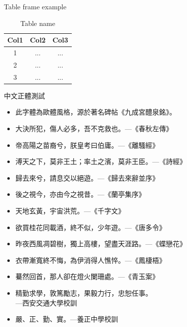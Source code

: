 \documentclass{beamer}
\begin{document}
\begin{frame}{Table frame example}

\begin{table}
    \begin{tabular}{c|cc}
        \textbf{Col1} & Col2 & Col3 \\
        \hline
        1            & ...                    & ...             \\
        2            & ...                    & ...             \\
        3            & ...                    & ...             \\
    \end{tabular}
    \caption{Table name}
    \label{tab:table1}
\end{table}

\end{frame}

\begin{frame}{中文正體測試}
    \begin{itemize}
        \item 此字體為歐體風格，源於著名碑帖《九成宮醴泉銘》。
        \item 大決所犯，傷人必多，吾不克救也。---《春秋左傳》
        \item 帝高陽之苗裔兮，朕皇考曰伯庸。---《離騷經》
        \item 溥天之下，莫非王土；率土之濱，莫非王臣。---《詩經》
        \item 歸去來兮，請息交以絕遊。---《歸去來辭並序》
        \item 後之視今，亦由今之視昔。---《蘭亭集序》
        \item 天地玄黃，宇宙洪荒。---《千字文》
        \item 欲買桂花同載酒，終不似，少年遊。---《唐多令》
        \item 昨夜西風凋碧樹，獨上高樓，望盡天涯路。---《蝶戀花》
        \item 衣帶漸寬終不悔，為伊消得人憔悴。---《鳳棲梧》
        \item 驀然回首，那人卻在燈火闌珊處。---《青玉案》
        \item 精勤求學，敦篤勵志，果毅力行，忠恕任事。\\---西安交通大學校訓
        \item 嚴、正、勤、實。---養正中學校訓
    \end{itemize}
\end{frame}
\end{document}
